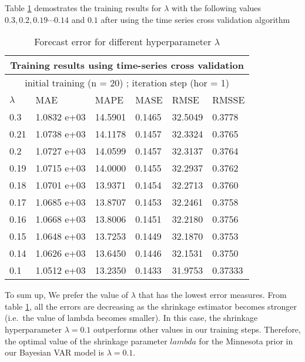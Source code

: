 \documentclass{monashthesis}
\begin{document}
Table \ref{testres} demostrates the training results for \(\lambda\) with the following values \(0.3,0.2,0.19 \cdots 0.14\) and \(0.1\) after using the time series cross validation algorithm

\begin{table}[h]
\begin{center}
\begin{tabular}{|p{2cm}|p{2cm}|p{2cm}|p{2cm}|p{2cm}|p{2cm}|}
\hline\hline
\multicolumn{6}{|c|}{Training results using time-series cross validation}\\
\hline
\multicolumn{6}{|c|}{initial training (n = 20) ; iteration step (hor = 1)}\\
\hline\hline
 $\lambda$    & MAE         & MAPE    & MASE   & RMSE    & RMSSE  \\
\hline\hline
0.3  & 1.0832 e+03 & 14.5901 & 0.1465 & 32.5049 & 0.3778 \\
0.21 & 1.0738 e+03 & 14.1178 & 0.1457 & 32.3324 & 0.3765 \\
0.2  & 1.0727 e+03 & 14.0599 & 0.1457 & 32.3137 & 0.3764 \\
0.19 & 1.0715 e+03 & 14.0000 & 0.1455 & 32.2937 & 0.3762 \\
0.18 & 1.0701 e+03 & 13.9371 & 0.1454 & 32.2713 & 0.3760 \\
0.17 & 1.0685 e+03 & 13.8707 & 0.1453 & 32.2461 & 0.3758 \\
0.16 & 1.0668 e+03 & 13.8006 & 0.1451 & 32.2180 & 0.3756 \\
0.15 & 1.0648 e+03 & 13.7253 & 0.1449 & 32.1870 & 0.3753 \\
0.14 & 1.0626 e+03 & 13.6450 & 0.1446 & 32.1531 & 0.3750 \\
0.1  & 1.0512 e+03 & 13.2350 & 0.1433 & 31.9753 & 0.37333\\
\hline\hline
\end{tabular}
\end{center}
\caption{Forecast error for different hyperparameter $\lambda$}
\label{testres}
\end{table}

To sum up, We prefer the value of \(\lambda\) that has the lowest error measures. From table \ref{testres}, all the errors are decreasing as the shrinkage estimator becomes stronger (i.e.~the value of lambda becomes smaller). In this case, the shrinkage hyperparameter \(\lambda=0.1\) outperforms other values in our training steps. Therefore, the optimal value of the shrinkage parameter \(lambda\) for the Minnesota prior in our Bayesian VAR model is \(\lambda=0.1\).
\end{document}
